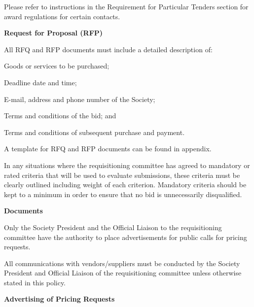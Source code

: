 \begin{longenum}[label*=\thesection.\arabic*., align=left]
\begin{longenum} [label*=\arabic*., align=left]
	\item 	Please refer to instructions in the Requirement for Particular Tenders section for award regulations for certain contacts.
\end{longenum}

\item \textbf{Request for Proposal (RFP)}

\begin{longenum} [label*=\arabic*., align=left]
		\item All RFQ and RFP documents must include a detailed description of:
	\begin{longenum} [label*=\arabic*., align=left]	
		\item Goods or services to be purchased; 
	\item 	Deadline date and time;
	\item	E-mail, address and phone number of the Society; 
	\item 	Terms and conditions of the bid; and
	\item 	Terms and conditions of subsequent purchase and payment.
		
	\item 	A template for RFQ and RFP documents can be found in appendix.
		
	\item	In any situations where the requisitioning committee has agreed to mandatory or rated criteria that will be used to evaluate submissions, these criteria must be clearly outlined including weight of each criterion. Mandatory criteria should be kept to a minimum in order to ensure that no bid is unnecessarily disqualified. 
\end{longenum}
\end{longenum}
\item \textbf{Documents}

\begin{longenum} [label*=\arabic*., align=left]
		\item Only the Society President and the Official Liaison to the requisitioning committee have the authority to place advertisements for public calls for pricing requests. 
		
		\item All communications with vendors/suppliers must be conducted by the Society President and Official Liaison of the requisitioning committee unless otherwise stated in this policy.
\end{longenum}

\item \textbf{Advertising of Pricing Requests}


\end{longenum}
